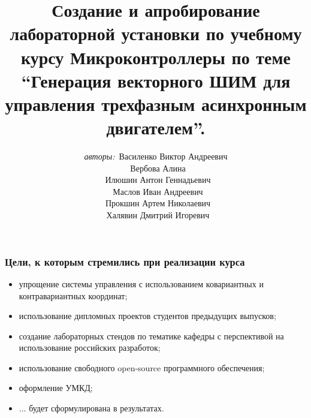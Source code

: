 \documentclass[14pt]{beamer}
\begin{document}
\title{\small{Создание и апробирование лабораторной установки по учебному курсу Микроконтроллеры по теме \enquote{Генерация векторного ШИМ для управления трехфазным асинхронным двигателем}.}}
\author{\small{%
\emph{авторы:}~Василенко Виктор Андреевич\\%
\emph{}~Вербова Алина\\
\emph{}~Илюшин Антон Геннадьевич\\
\emph{}~Маслов Иван Андреевич\\
\emph{}~Прокшин Артем Николаевич\\%
\emph{}~Халявин Дмитрий Игоревич}}



\vspace{30pt}%

\vspace{60pt}%



\begin{frame}
\titlepage	
\end{frame}

\begin{frame}
\frametitle{\small Цели, к которым стремились при реализации курса} 
\begin{itemize}
\item упрощение системы управления с использованием ковариантных и контравариантных координат;
\item использование дипломных проектов студентов предыдущих выпусков;
\item создание лабораторных стендов по тематике кафедры с перспективой на использование российских разработок;
\item использование свободного open-source программного обеспечения;
\item оформление УМКД;
\item ... будет сформулирована в результатах.
\end{itemize}
\end{frame}
\end{document}
